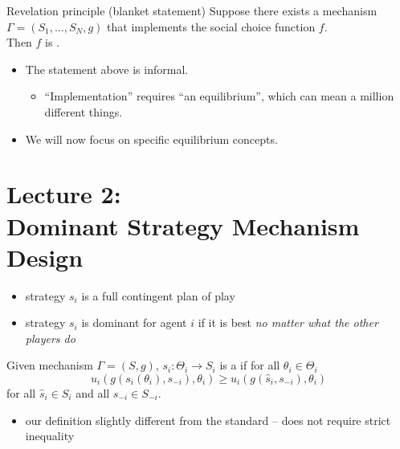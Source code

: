 \documentclass[english,handout,10pt]{beamer}		%
\def\lyxframeend{} %
\begin{document}
\begin{block}{Revelation principle (blanket statement)}
	Suppose there exists a mechanism $\Gamma=(S_{1},\dots,S_{N},g)$ that implements the social choice function $f$.\\ Then $f$ is .
\end{block}
\pause\medskip
\begin{itemize}
	\item The statement above is informal.
	\begin{itemize}
		\item ``Implementation'' requires ``an equilibrium'', which can mean a million different things.
	\end{itemize}
	\item We will now focus on specific equilibrium concepts.
\end{itemize}
\lyxframeend





\section{Lecture 2: \\ Dominant Strategy Mechanism Design}

\begin{itemize}
	\item strategy $s_i$ is a full contingent plan of play
	\item strategy $s_i$ is dominant for agent $i$ if it is best \emph{no matter what the other players do}
\end{itemize}
\begin{definition}
	Given mechanism $\Gamma=(S,g)$,
	$s_{i}: \Theta_{i}\rightarrow S_{i}$ is a  if for all $\theta_{i}\in \Theta_{i}$
	$$ u_{i}(g(s_{i}(\theta_{i}),s_{-i}),\theta_{i})\geq u_{i}(g(\hat s_{i},s_{-i}),\theta_{i})$$
	for all $\hat s_{i}\in S_{i}$  and all $s_{-i}\in S_{-i}$.
\end{definition}
\pause
\begin{itemize}
	\item our definition slightly different from the standard -- does not require strict inequality
\end{itemize}
\lyxframeend
\end{document}
